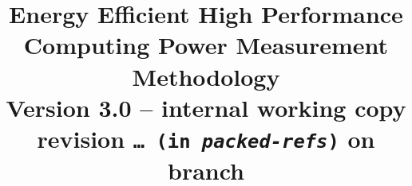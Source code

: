 \documentclass[runningheads]{scrreprt}
\newcommand{\commit}{\dots~(in \emph{packed-refs})}}
\begin{document}
\graphicspath{{figures/}}

\pagestyle{headings}  %

\title{
Energy Efficient High Performance Computing Power Measurement Methodology \\
\bigskip
\normalsize{Version 3.0 -- internal working copy}\\
\bigskip
\scriptsize{revision \texttt{\commit} on branch \texttt{\branch}}
}


\date{ }
\maketitle              %

\tableofcontents
\listoftables
\listoffigures

\newcommand{\SpecAccuracyLThree}{1\%}
\newcommand{\SpecAccuracyLTwo}{2\%}
\newcommand{\SpecAccuracyLOne}{5\%}
\newcommand{\SpecAccuracyMeter}{3\%}
\newcommand{\SpecPowerMinLOne}{2~kW}
\newcommand{\SpecPowerMinLTwo}{10~kW}
\newcommand{\SpecPowerMaxLOne}{40~kW}
\newcommand{\SpecFracMinLOne}{$\frac{1}{10}$}
\newcommand{\SpecFracMinLTwo}{$\frac{1}{8}$}
\newcommand{\SpecMinNodes}{15}
\newcommand{\MinMeasurementsCorePhaseLTwoThree}{10}
\newcommand{\MaxReadingIntervalCorePhaseLTwoThree}{10\%}
\newcommand{\MaxSecMissingLThree}{10}
\newcommand{\MaxSecMissingLThreeHalf}{5} %

%



\newpage




\end{document}
